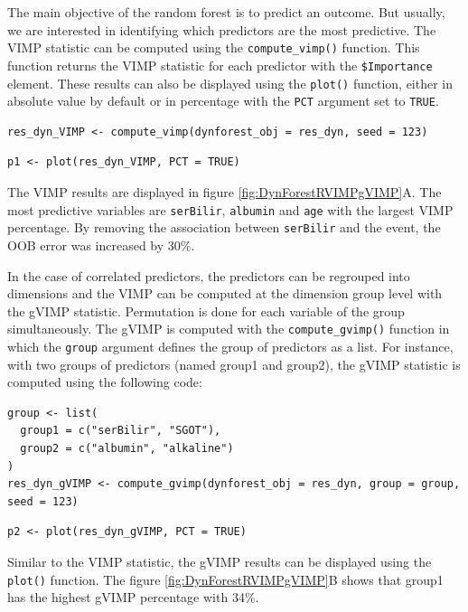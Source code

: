The main objective of the random forest is to predict an outcome. But usually, we are interested in identifying which predictors are the most predictive. The VIMP statistic \citep{ishwaran_random_2008} can be computed using the \texttt{compute\_vimp()} function. This function returns the VIMP statistic for each predictor with the \texttt{\$Importance} element. These results can also be displayed using the \texttt{plot()} function, either in absolute value by default or in percentage with the \texttt{PCT} argument set to \texttt{TRUE}.

\begin{verbatim}
res_dyn_VIMP <- compute_vimp(dynforest_obj = res_dyn, seed = 123)
\end{verbatim}

\begin{verbatim}
p1 <- plot(res_dyn_VIMP, PCT = TRUE)
\end{verbatim}

The VIMP results are displayed in figure \ref{fig:DynForestRVIMPgVIMP}A. The most predictive variables are \texttt{serBilir}, \texttt{albumin} and \texttt{age} with the largest VIMP percentage. By removing the association between \texttt{serBilir} and the event, the OOB error was increased by 30\%.

In the case of correlated predictors, the predictors can be regrouped into dimensions and the VIMP can be computed at the dimension group level with the gVIMP statistic. Permutation is done for each variable of the group simultaneously. The gVIMP is computed with the \texttt{compute\_gvimp()} function in which the \texttt{group} argument defines the group of predictors as a list. For instance, with two groups of predictors (named group1 and group2), the gVIMP statistic is computed using the following code:

\begin{verbatim}
group <- list(
  group1 = c("serBilir", "SGOT"),
  group2 = c("albumin", "alkaline")
)
res_dyn_gVIMP <- compute_gvimp(dynforest_obj = res_dyn, group = group, seed = 123)
\end{verbatim}

\begin{verbatim}
p2 <- plot(res_dyn_gVIMP, PCT = TRUE)
\end{verbatim}

Similar to the VIMP statistic, the gVIMP results can be displayed using the \texttt{plot()} function. The figure \ref{fig:DynForestRVIMPgVIMP}B shows that group1 has the highest gVIMP percentage with 34\%.

